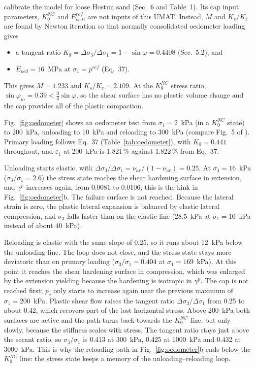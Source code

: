 \documentclass[11pt,a4paper]{article}
\newcommand{\eref}{^{\mathit{ref}}}
\begin{document}
\citet{Schanz_1999} calibrate the model for loose Hostun sand (Sec.~6 and Table~1). Its cap input parameters,
$K_0^{NC}$ and $E_{oed}\eref$, are not inputs of this UMAT. Instead, $M$ and $K_s/K_c$ are found by
Newton iteration so that normally consolidated oedometer loading gives
\begin{itemize}
  \item a tangent ratio $K_0 = \Delta\sigma_3/\Delta\sigma_1 = 1 - \sin\varphi = 0.4408$
        (Sec.~5.2), and
  \item $E_{oed} = 16$~MPa at $\sigma_1 = p\eref$ (Eq.~37).
\end{itemize}
This gives $M = 1.233$ and $K_s/K_c = 2.109$. At the $K_0^{NC}$ stress ratio,
$\sin\varphi_m = 0.39 < \frac{3}{4}\sin\varphi$, so the shear surface has no plastic volume change
and the cap provides all of the plastic compaction.

Fig.~\ref{fig:oedometer} shows an oedometer test from $\sigma_1 = 2$~kPa (in a $K_0^{NC}$ state) to
200~kPa, unloading to 10~kPa and reloading to 300~kPa (compare Fig.~5 of \citealp{Schanz_1999}). Primary
loading follows Eq.~37 (Table~\ref{tab:oedometer}), with $K_0 = 0.441$ throughout, and $\varepsilon_1$
at 200~kPa is 1.821\,\% against 1.822\,\% from Eq.~37.

Unloading starts elastic, with $\Delta\sigma_3/\Delta\sigma_1 = \nu_{ur}/(1 - \nu_{ur}) = 0.25$. At
$\sigma_1 = 16$~kPa ($\sigma_3/\sigma_1 = 2.6$) the stress state reaches the shear hardening surface
in extension, and $\gamma^p$ increases again, from 0.0081 to 0.0106; this is the kink in
Fig.~\ref{fig:oedometer}b. The failure surface is not reached. Because the lateral strain is zero,
the plastic lateral expansion is balanced by elastic lateral compression, and $\sigma_3$ falls
faster than on the elastic line (28.5~kPa at $\sigma_1 = 10$~kPa instead of about 40~kPa).

Reloading is elastic with the same slope of 0.25, so it runs about 12~kPa below the unloading
line. The loop does not close, and the stress state stays more deviatoric than on primary loading
($\sigma_3/\sigma_1 = 0.404$ at $\sigma_1 = 169$~kPa). At this point it reaches the shear hardening
surface in compression, which was enlarged by the extension yielding because the hardening is
isotropic in $\gamma^p$. The cap is not reached first; $p_c$ only starts to increase again near
the previous maximum of $\sigma_1 = 200$~kPa. Plastic shear flow raises the tangent ratio
$\Delta\sigma_3/\Delta\sigma_1$ from 0.25 to about 0.42, which recovers part of the lost horizontal
stress. Above 200~kPa both surfaces are active and the path turns back towards the $K_0^{NC}$ line,
but only slowly, because the stiffness scales with stress. The tangent ratio stays just above the
secant ratio, so $\sigma_3/\sigma_1$ is 0.413 at 300~kPa, 0.425 at 1000~kPa and 0.432 at 3000~kPa.
This is why the reloading path in Fig.~\ref{fig:oedometer}b ends below the $K_0^{NC}$ line: the
stress state keeps a memory of the unloading--reloading loop.
\end{document}
